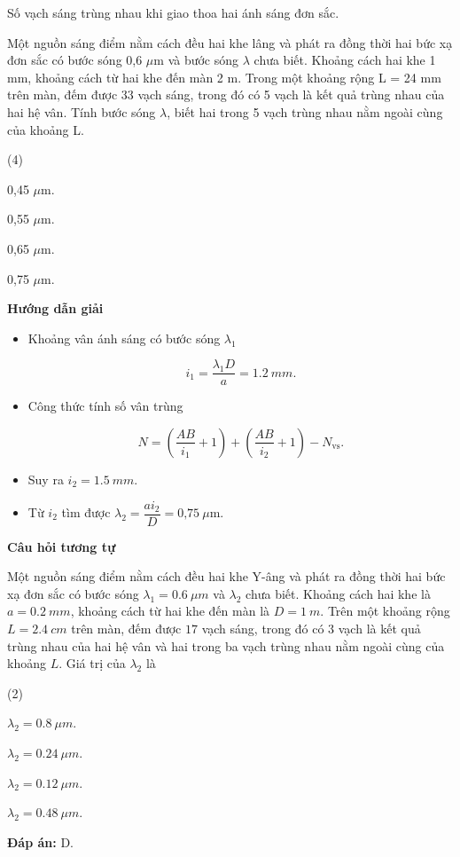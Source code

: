 \begin{dang}{Số vạch sáng trùng nhau khi giao thoa hai ánh sáng đơn sắc.}
	{
		Một nguồn sáng điểm nằm cách đều hai khe lâng và phát ra đồng thời hai bức xạ đơn sắc có bước sóng 0,6 $\mu$m và bước sóng $\lambda$  chưa biết. Khoảng cách hai khe 1 mm, khoảng cách từ hai khe đến màn 2 m. Trong một khoảng rộng L = 24 mm trên màn, đếm được 33 vạch sáng, trong đó có 5 vạch là kết quả trùng nhau của hai hệ vân. Tính bước sóng $\lambda$, biết hai trong 5 vạch trùng nhau nằm ngoài cùng của khoảng L.
		\begin{mcq}(4)
			\item 0,45 $\mu$m.		
			\item 0,55 $\mu$m.			
			\item 0,65 $\mu$m.		
			\item 0,75 $\mu$m.
		\end{mcq}
	}
	{
		\begin{center}
			\textbf{Hướng dẫn giải}
		\end{center}
		\begin{itemize}
			\item Khoảng vân ánh sáng có bước sóng $\lambda_1$
			
			\begin{equation*}
				i_1=\dfrac{\lambda_1 D}{a}= \SI{1,2}{mm}.
			\end{equation*}
			
			\item Công thức tính số vân trùng
			
			\begin{equation*}
				N= \left(\dfrac{AB}{i_1}+1\right) +\left(\dfrac{AB}{i_2}+1\right) - N_{\text{vs}}.
			\end{equation*}
			
			\item Suy ra $i_2= \SI{1,5}{mm}$. 
			\item Từ $i_2$ tìm được $\lambda_2 =\dfrac{ai_2}{D}=\text{0,75}\ \mu \text{m}$.
		\end{itemize}
		
		\begin{center}
			\textbf{Câu hỏi tương tự}
		\end{center}
		
		Một nguồn sáng điểm nằm cách đều hai khe Y-âng và phát ra đồng thời hai bức xạ đơn sắc có bước sóng $ \lambda_{1} = \SI{0,6}{\mu m} $ và $ \lambda_{2} $ chưa biết. Khoảng cách hai khe là $ a = \SI{0,2}{mm} $, khoảng cách từ hai khe đến màn là $ D = \SI{1}{m} $. Trên một khoảng rộng $ L = \SI{2,4}{cm} $ trên màn, đếm được $ 17 $ vạch sáng, trong đó có $ 3 $ vạch là kết quả trùng nhau của hai hệ vân và hai trong ba vạch trùng nhau nằm ngoài cùng của khoảng $ L $. Giá trị của $ \lambda_{2} $ là
		\begin{mcq}(2)
			\item $ \lambda_{2} = \SI{0,8}{\mu m} $.
			\item $ \lambda_{2} = \SI{0,24}{\mu m} $.
			\item $ \lambda_{2} = \SI{0,12}{\mu m} $.
			\item $ \lambda_{2} = \SI{0,48}{\mu m} $.
		\end{mcq}
		\textbf{Đáp án:} D.
	}
\end{dang}

